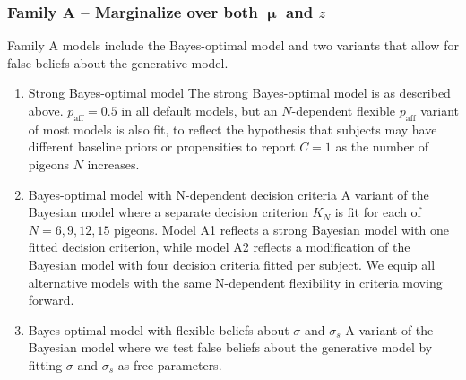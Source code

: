 \documentclass{article}
\newcommand{\mu}{\boldsymbol\upmu}
\begin{document}
\subsubsection*{Family A -- Marginalize over both $\mu$ and $z$} 
Family A models include the Bayes-optimal model and two variants that allow for false beliefs about the generative model.
\begin{enumerate}[label=A(\arabic*)]
\item Strong Bayes-optimal model \newline
The strong Bayes-optimal model is as described above. $p_\text{aff} = 0.5$ in all default models, but an $N$-dependent flexible $p_\text{aff}$ variant of most models is also fit, to reflect the hypothesis that subjects may have different baseline priors or propensities to report $C=1$ as the number of pigeons $N$ increases.
\item Bayes-optimal model with N-dependent decision criteria \newline
A variant of the Bayesian model where a separate decision criterion $K_N$ is fit for each of $N=6, 9, 12, 15$ pigeons. Model A1 reflects a strong Bayesian model with one fitted decision criterion, while model A2 reflects a modification of the Bayesian model with four decision criteria fitted per subject. We equip all alternative models with the same N-dependent flexibility in criteria moving forward.

\item Bayes-optimal model with flexible beliefs about $\sigma$ and $\sigma_s$ \newline
A variant of the Bayesian model where we test false beliefs about the generative model by fitting $\sigma$ and $\sigma_s$ as free parameters.
\end{enumerate}

\end{document}
